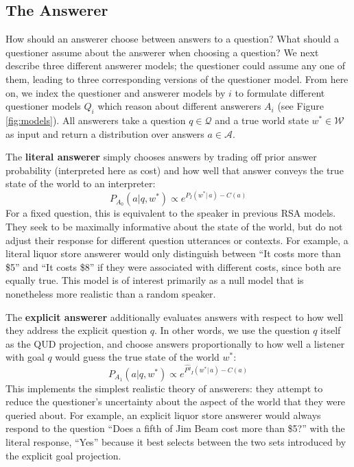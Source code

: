 \documentclass[12pt, floatsintext, jou]{apa6}
\begin{document}
\subsection{The Answerer}

How should an answerer choose between answers to a question? What should a questioner assume about the answerer when choosing a question? We next describe three different answerer models; the questioner could assume any one of them, leading to three corresponding versions of the questioner model. From here on, we index the questioner and answerer models by $i$ to formulate different questioner models $Q_i$ which reason about different answerers $A_i$ (see Figure \ref{fig:models}).
All answerers take a question $q \in \mathcal{Q}$ and a true world state $w^* \in \mathcal{W}$ as input and return a distribution over answers $a \in \mathcal{A}$.
%

The \textbf{literal answerer} simply chooses answers by trading off prior answer probability (interpreted here as cost) and how well that answer conveys the true state of the world to an interpreter:
%
$$P_{A_0}(a | q,w^*) \propto e^{P_I(w^* | \,a) - C(a)} $$
%
For a fixed question, this is equivalent to the speaker in previous RSA models. They seek to be maximally informative about the state of the world, but do not adjust their response for different question utterances or contexts. For example, a literal liquor store answerer would only distinguish between ``It costs more than \$5'' and ``It costs \$8'' if they were associated with different costs, since both are equally true. This model is of interest primarily as a null model that is nonetheless more realistic than a random speaker. 
%

The \textbf{explicit answerer} additionally evaluates answers with respect to how well they address the explicit question $q$. In other words, we use the question $q$ itself as the QUD projection, and choose answers proportionally to how well a listener with goal $q$ would guess the true state of the world $w^*$:
%
$$P_{A_1}(a | q, w^*) \propto e^{\widehat{P^q}_I(w^* | \, a) - C(a)}$$
This implements the simplest realistic theory of answerers: they attempt to reduce the questioner's uncertainty about the aspect of the world that they were queried about. For example, an explicit liquor store answerer would always respond to the question ``Does a fifth of Jim Beam cost more than \$5?'' with the literal response, ``Yes'' because it best selects between the two sets introduced by the explicit goal projection. 
\end{document}
